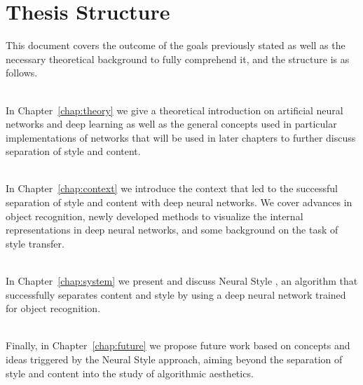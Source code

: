 
\section{Thesis Structure}
\label{sec:intro:structure}

This document covers the outcome of the goals previously stated as well as the necessary theoretical background to fully comprehend it, and the structure is as follows.

\begin{minipage}{\textwidth}
  \textbf{} \\[0.2em]
  In Chapter~\ref{chap:theory} we give a theoretical introduction on artificial neural networks and deep learning as well as the general concepts used in particular implementations of networks that will be used in later chapters to further discuss separation of style and content.
\end{minipage}

\begin{minipage}{\textwidth}
  \textbf{} \\[0.2em]
  In Chapter~\ref{chap:context} we introduce the context that led to the successful separation of style and content with deep neural networks. We cover advances in object recognition, newly developed methods to visualize the internal representations in deep neural networks, and some background on the task of style transfer.
\end{minipage}

\begin{minipage}{\textwidth}
  \textbf{} \\[0.2em]
  In Chapter~\ref{chap:system} we present and discuss Neural Style \cite{Gatys2015B}, an algorithm that successfully separates content and style by using a deep neural network trained for object recognition.
\end{minipage}

\begin{minipage}{\textwidth}
  \textbf{} \\[0.2em]
  Finally, in Chapter~\ref{chap:future} we propose future work based on concepts and ideas triggered by the Neural Style approach, aiming beyond the separation of style and content into the study of algorithmic aesthetics.
\end{minipage}
